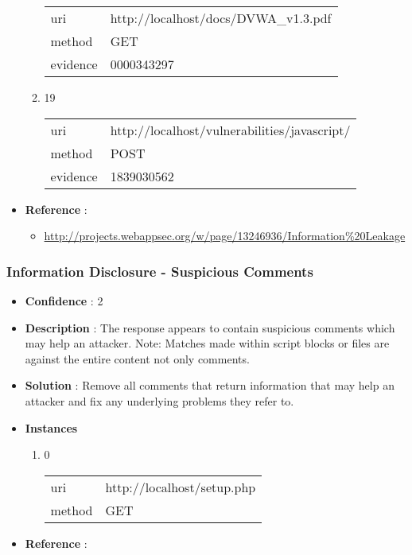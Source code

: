 \documentclass[10pt]{article}
\begin{document}
\begin{itemize}
\begin{enumerate}
\begin{tabular}{| l | p{14cm}}
uri & http://localhost/docs/DVWA{\_}v1.3.pdf \\
method & GET \\
evidence & 0000343297 \\
\end{tabular}
\item[] 19
\begin{tabular}{| l | p{14cm}}
uri & http://localhost/vulnerabilities/javascript/ \\
method & POST \\
evidence & 1839030562 \\
\end{tabular}
\end{enumerate}
\item[] \textbf{Reference} : 
\begin{itemize}
\item \url{http://projects.webappsec.org/w/page/13246936/Information\%20Leakage}
\end{itemize}
\end{itemize}
\subsubsection{Information Disclosure - Suspicious Comments}
\begin{itemize}
\item[] \textbf{Confidence} : 2
\item[] \textbf{Description} : The response appears to contain suspicious comments which may help an attacker. Note: Matches made within script blocks or files are against the entire content not only comments.
\item[] \textbf{Solution} :  Remove all comments that return information that may help an attacker and fix any underlying problems they refer to.
\item[] \textbf{Instances}
\begin{enumerate}
\item[] 0
\begin{tabular}{| l | p{14cm}}
uri & http://localhost/setup.php \\
method & GET \\
\end{tabular}
\end{enumerate}
\item[] \textbf{Reference} : 
\end{itemize}
\end{document}
